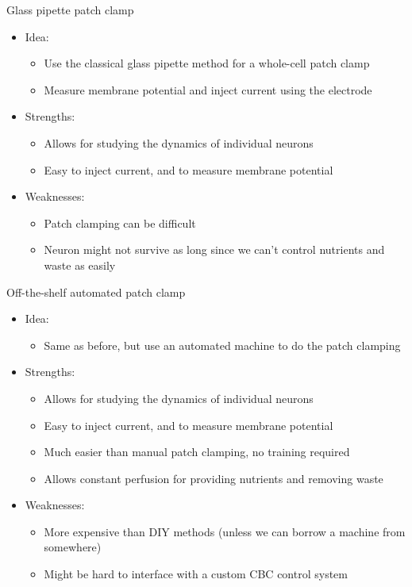 \documentclass[aspectratio=169]{beamer}
\begin{document}
\begin{frame}[label={sec:org2d93f96}]{Glass pipette patch clamp}
\begin{itemize}
\item Idea:
\begin{itemize}
\item Use the classical glass pipette method for a whole-cell patch clamp
\item Measure membrane potential and inject current using the electrode
\end{itemize}
\item Strengths:
\begin{itemize}
\item Allows for studying the dynamics of individual neurons
\item Easy to inject current, and to measure membrane potential
\end{itemize}
\item Weaknesses:
\begin{itemize}
\item Patch clamping can be difficult
\item Neuron might not survive as long since we can't control nutrients and waste as easily
\end{itemize}
\end{itemize}
\end{frame}

\begin{frame}[label={sec:orgec9fe43}]{Off-the-shelf automated patch clamp}
\begin{itemize}
\item Idea:
\begin{itemize}
\item Same as before, but use an automated machine to do the patch clamping
\end{itemize}
\item Strengths:
\begin{itemize}
\item Allows for studying the dynamics of individual neurons
\item Easy to inject current, and to measure membrane potential
\item Much easier than manual patch clamping, no training required
\item Allows constant perfusion for providing nutrients and removing waste
\end{itemize}
\item Weaknesses:
\begin{itemize}
\item More expensive than DIY methods (unless we can borrow a machine from somewhere)
\item Might be hard to interface with a custom CBC control system
\end{itemize}
\end{itemize}
\end{frame}
\end{document}
